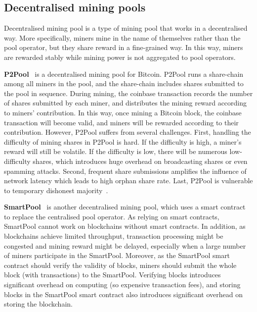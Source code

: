 \subsection{Decentralised mining pools}



Decentralised mining pool is a type of mining pool that works in a decentralised way.
More specifically, miners mine in the name of themselves rather than the pool operator, but they share reward in a fine-grained way.
In this way, miners are rewarded stably while mining power is not aggregated to pool operators.



\textbf{P2Pool}~\cite{p2pool} is a decentralised mining pool for Bitcoin.
P2Pool runs a share-chain among all miners in the pool, and the share-chain includes shares submitted to the pool in sequence.
During mining, the coinbase transaction records the number of shares submitted by each miner, and distributes the mining reward according to miners' contribution.
In this way, once mining a Bitcoin block, the coinbase transaction will become valid, and miners will be rewarded according to their contribution.
However, P2Pool suffers from several challenges.
First, handling the difficulty of mining shares in P2Pool is hard.
If the difficulty is high, a miner's reward will still be volatile.
If the difficulty is low, there will be numerous low-difficulty shares, which introduces huge overhead on broadcasting shares or even spamming attacks.
Second, frequent share submissions amplifies the influence of network latency which leads to high orphan share rate.
Last, P2Pool is vulnerable to temporary dishonest majority~\cite{decentralised-mining-pool-security}.

\textbf{SmartPool}~\cite{luu2017smartpool} is another decentralised mining pool, which uses a smart contract to replace the centralised pool operator.
As relying on smart contracts, SmartPool cannot work on blockchains without smart contracts.
In addition, as blockchains achieve limited throughput, transaction processing might be congested and mining reward might be delayed, especially when a large number of miners participate in the SmartPool.
Moreover, as the SmartPool smart contract should verify the validity of blocks, miners should submit the whole block (with transactions) to the SmartPool.
Verifying blocks introduces significant overhead on computing (so expensive transaction fees), and storing blocks in the SmartPool smart contract also introduces significant overhead on storing the blockchain.

